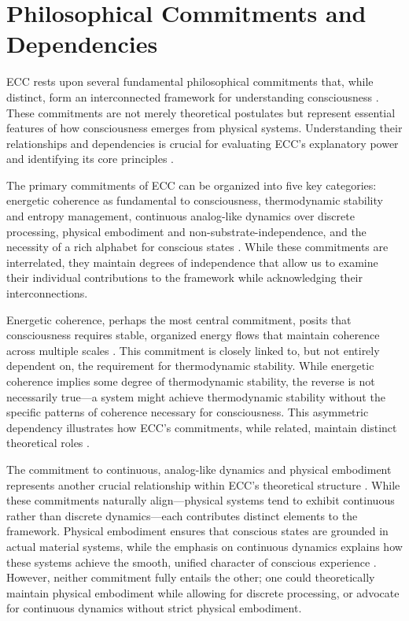 \section{Philosophical Commitments and Dependencies}

ECC rests upon several fundamental philosophical commitments that, while distinct, form an interconnected framework for understanding consciousness \cite{van1995what}. These commitments are not merely theoretical postulates but represent essential features of how consciousness emerges from physical systems. Understanding their relationships and dependencies is crucial for evaluating ECC's explanatory power and identifying its core principles \cite{di2017sensorimotor}.

The primary commitments of ECC can be organized into five key categories: energetic coherence as fundamental to consciousness, thermodynamic stability and entropy management, continuous analog-like dynamics over discrete processing, physical embodiment and non-substrate-independence, and the necessity of a rich alphabet for conscious states \cite{noe2004action}. While these commitments are interrelated, they maintain degrees of independence that allow us to examine their individual contributions to the framework while acknowledging their interconnections.

Energetic coherence, perhaps the most central commitment, posits that consciousness requires stable, organized energy flows that maintain coherence across multiple scales \cite{thompson2007mind}. This commitment is closely linked to, but not entirely dependent on, the requirement for thermodynamic stability. While energetic coherence implies some degree of thermodynamic stability, the reverse is not necessarily true—a system might achieve thermodynamic stability without the specific patterns of coherence necessary for consciousness. This asymmetric dependency illustrates how ECC's commitments, while related, maintain distinct theoretical roles \cite{varela1991embodied}.

The commitment to continuous, analog-like dynamics and physical embodiment represents another crucial relationship within ECC's theoretical structure \cite{gallagher2005how}. While these commitments naturally align—physical systems tend to exhibit continuous rather than discrete dynamics—each contributes distinct elements to the framework. Physical embodiment ensures that conscious states are grounded in actual material systems, while the emphasis on continuous dynamics explains how these systems achieve the smooth, unified character of conscious experience \cite{oregan2001sensorimotor}. However, neither commitment fully entails the other; one could theoretically maintain physical embodiment while allowing for discrete processing, or advocate for continuous dynamics without strict physical embodiment.

